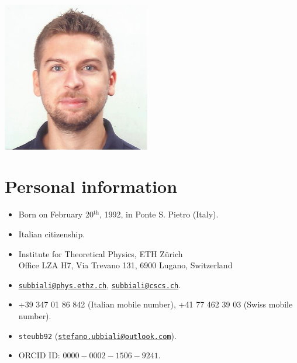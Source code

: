 \documentclass[12pt, a4paper, twoside, openright, notitlepage]{article}
\theoremstyle{theorem}
\theoremstyle{definition}
\theoremstyle{remark}
\theoremstyle{proposition}
\begin{document}
	\hspace*{-0.7cm} \begin{minipage}{0.85\textwidth}
		\noindent \fontsize{18}{26}

		\vspace*{0.5cm}

		\noindent \fontsize{14}{18}\selectfont{Doctoral student in Computational Physics, ETH Z\"urich}

		\vspace*{0.5cm}

		\noindent \fontsize{14}{18} \\
		\noindent \fontsize{14}{18}
	\end{minipage}
	\hfill
	\begin{minipage}{0.13\textwidth}
		\centering
		\hspace*{-1.6cm} \includegraphics[scale=0.95]{passport.pdf}
	\end{minipage}

	\vspace*{0.2cm}

	\section*{Personal information}
		\begin{itemize}
        \item[\faChild] Born on February 20$^{\text{th}}$, 1992, in Ponte S.
        Pietro (Italy).
        \item[\faFlagO] Italian citizenship.
        \item[\faBuildingO] Institute for Theoretical Physics, ETH Z\"urich \\
        Office LZA H7, Via Trevano 131, 6900 Lugano, Switzerland 
        \item[\faEnvelopeO] \href{mailto:subbiali@phys.ethz.ch}{\texttt{subbiali@phys.ethz.ch}}, \href{mailto:subbiali@cscs.ch}{\texttt{subbiali@cscs.ch}}.
        \item[\faPhone] +39 347 01 86 842 (Italian mobile number),
        +41 77 462 39 03 (Swiss mobile number).
        \item[\faSkype] \texttt{steubb92} (\href{mailto:stefano.ubbiali@outlook.com}{\texttt{stefano.ubbiali@outlook.com}}).
        \item[\faBook] ORCID ID: $0000-0002-1506-9241$.
    \end{itemize} 
    
\end{document}
